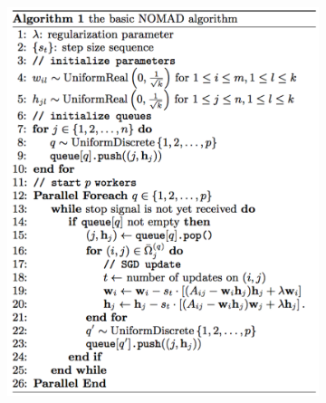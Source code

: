 \documentclass{article} %
\begin{document}
\begin{figure}[hb]
  \centering
  \begin{subfigure}[b]{0.5\textwidth}
    \includegraphics[width=\textwidth]{figures/nomad-alg}
    \vspace{15pt}
  \end{subfigure}%
  ~ %
  \begin{subfigure}[b]{0.5\textwidth}

\end{subfigure}
\end{figure}
\end{document}
